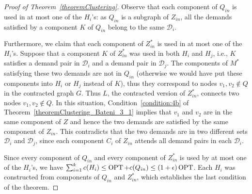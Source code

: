 \begin{proof}[Proof of Theorem~\ref{theoremClustering}]
Observe that each component of \(Q_{in}\) is used in at most one of the \(H_i\)’s: as \(Q_{in}\) is a subgraph of \(Z_{in}\), all the demands satisfied by a component \(K\) of \(Q_{in}\) belong to the same \(\mathcal{D}_i\).

Furthermore, we claim that each component of \(Z_{in}^\ast\) is used in at most one of the \(H_i\)'s. Suppose that a component \(K\) of \(Z_{in}^\ast\) was used in both \(H_i\) and \(H_j\), i.e., \(K\) satisfies a demand pair in \(\mathcal{D}_i\) and a demand pair in \(\mathcal{D}_j\). The components of \(M^\ast\) satisfying these two demands are not in \(Q_{in}\) (otherwise we would have put these components into \(H_i\) or \(H_j\) instead of \(K\)), thus they correspond to nodes \(v_1, v_2 \notin Q\) in the contracted graph \(G\). Thus \(L\), the contracted version of \(Z_{in}^\ast\), connects two nodes \(v_1, v_2 \notin Q\). In this situation, Condition~\eqref{condition:4b} of Theorem~\ref{theoremClustering_Bateni_3_1} implies that \(v_1\) and \(v_2\) are in the same component of \(Z\) and hence the two demands are satisfied by the same component of \(Z_{in}\). This contradicts that the two demands are in two different sets \(\mathcal{D}_i\) and \(\mathcal{D}_j\), since each component \(C_i\) of \(Z_{in}\) attends all demand pairs in each \(\mathcal{D}_i\).

Since every component of \(Q_{in}\) and every component of \(Z_{in}^\ast\) is used by at most one of the \(H_i\)'s, we have \(\sum_{i=1}^k c(H_i) \leq \operatorname{\textrm{OPT}} + c(Q_{in}) \leq (1 + \epsilon) \operatorname{\textrm{OPT}}\). Each \(H_i\) was constructed from components of \(Q_{in}\) and \(Z_{in}^\ast\), which establishes the last condition of the theorem.

\end{proof}
